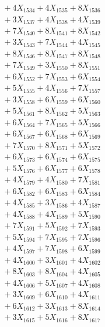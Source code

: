 \documentclass[a4paper,10pt]{article}
\begin{document}
{\begin{align}
&\;  + 4 X_{1534} + 4 X_{1535} + 8 X_{1536} \\[0.3ex]
&\;  + 3 X_{1537} + 4 X_{1538} + 4 X_{1539} \\[0.5ex]\allowbreak
&\;  + 7 X_{1540} + 8 X_{1541} + 8 X_{1542} \\[0.3ex]
&\;  + 3 X_{1543} + 7 X_{1544} + 4 X_{1545} \\[0.3ex]
&\;  + 8 X_{1546} + 8 X_{1547} + 8 X_{1548} \\[0.3ex]
&\;  + 7 X_{1549} + 3 X_{1550} + 8 X_{1551} \\[0.3ex]
&\;  + 6 X_{1552} + 7 X_{1553} + 6 X_{1554} \\[0.3ex]
&\;  + 5 X_{1555} + 4 X_{1556} + 7 X_{1557} \\[0.3ex]
&\;  + 3 X_{1558} + 6 X_{1559} + 6 X_{1560} \\[0.3ex]
&\;  + 5 X_{1561} + 8 X_{1562} + 5 X_{1563} \\[0.3ex]
&\;  + 6 X_{1564} + 7 X_{1565} + 5 X_{1566} \\[0.3ex]
&\;  + 6 X_{1567} + 6 X_{1568} + 6 X_{1569} \\[0.5ex]\allowbreak
&\;  + 7 X_{1570} + 8 X_{1571} + 5 X_{1572} \\[0.3ex]
&\;  + 6 X_{1573} + 6 X_{1574} + 6 X_{1575} \\[0.3ex]
&\;  + 5 X_{1576} + 6 X_{1577} + 6 X_{1578} \\[0.3ex]
&\;  + 4 X_{1579} + 4 X_{1580} + 7 X_{1581} \\[0.3ex]
&\;  + 6 X_{1582} + 6 X_{1583} + 6 X_{1584} \\[0.3ex]
&\;  + 4 X_{1585} + 3 X_{1586} + 4 X_{1587} \\[0.3ex]
&\;  + 4 X_{1588} + 4 X_{1589} + 5 X_{1590} \\[0.3ex]
&\;  + 7 X_{1591} + 5 X_{1592} + 7 X_{1593} \\[0.3ex]
&\;  + 5 X_{1594} + 7 X_{1595} + 7 X_{1596} \\[0.3ex]
&\;  + 4 X_{1597} + 7 X_{1598} + 6 X_{1599} \\[0.5ex]\allowbreak
&\;  + 4 X_{1600} + 3 X_{1601} + 4 X_{1602} \\[0.3ex]
&\;  + 8 X_{1603} + 8 X_{1604} + 4 X_{1605} \\[0.3ex]
&\;  + 4 X_{1606} + 5 X_{1607} + 4 X_{1608} \\[0.3ex]
&\;  + 3 X_{1609} + 6 X_{1610} + 4 X_{1611} \\[0.3ex]
&\;  + 6 X_{1612} + 3 X_{1613} + 8 X_{1614} \\[0.3ex]
&\;  + 3 X_{1615} + 5 X_{1616} + 8 X_{1617} \\[0.3ex]

\end{align}}
\end{document}
